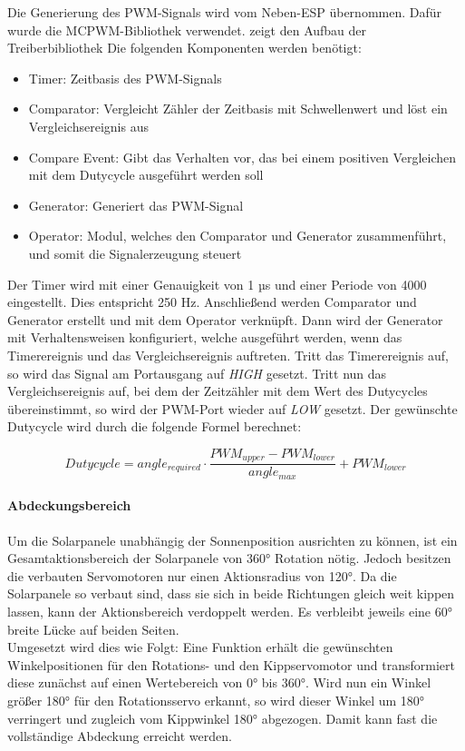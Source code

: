 Die Generierung des PWM-Signals wird vom Neben-ESP übernommen.
Dafür wurde die MCPWM-Bibliothek verwendet.
\autocite{fig:mcpwmOverview} zeigt den Aufbau der Treiberbibliothek
Die folgenden Komponenten werden benötigt:

\begin{itemize}
    \item Timer: Zeitbasis des PWM-Signals
    \item Comparator: Vergleicht Zähler der Zeitbasis mit Schwellenwert und löst ein Vergleichsereignis aus
    \item Compare Event: Gibt das Verhalten vor, das bei einem positiven Vergleichen mit dem Dutycycle ausgeführt werden soll
    \item Generator: Generiert das PWM-Signal
    \item Operator: Modul, welches den Comparator und Generator zusammenführt, und somit die Signalerzeugung steuert
\end{itemize}

Der Timer wird mit einer Genauigkeit von 1 µs und einer Periode von 4000 eingestellt.
Dies entspricht 250 Hz.
Anschließend werden Comparator und Generator erstellt und mit dem Operator verknüpft.
Dann wird der Generator mit Verhaltensweisen konfiguriert, welche ausgeführt werden, wenn das Timerereignis und das Vergleichsereignis auftreten.
Tritt das Timerereignis auf, so wird das Signal am Portausgang auf \emph{HIGH} gesetzt.
Tritt nun das Vergleichsereignis auf, bei dem der Zeitzähler mit dem Wert des Dutycycles übereinstimmt, so wird der PWM-Port wieder auf \emph{LOW} gesetzt.
Der gewünschte Dutycycle wird durch die folgende Formel berechnet:

\[Dutycycle = angle_{required} \cdot \frac{PWM_{upper} - PWM_{lower}}{angle_{max}} + PWM_{lower} \]


\paragraph{Abdeckungsbereich}
Um die Solarpanele unabhängig der Sonnenposition ausrichten zu können, ist ein Gesamtaktionsbereich der Solarpanele von 360° Rotation nötig.
Jedoch besitzen die verbauten Servomotoren nur einen Aktionsradius von 120°. Da die Solarpanele so verbaut sind, dass sie sich in beide Richtungen gleich weit kippen lassen,
kann der Aktionsbereich verdoppelt werden.
Es verbleibt jeweils eine 60° breite Lücke auf beiden Seiten.\\
Umgesetzt wird dies wie Folgt:
Eine Funktion erhält die gewünschten Winkelpositionen für den Rotations- und den Kippservomotor und transformiert diese zunächst auf einen Wertebereich von 0° bis 360°.
Wird nun ein Winkel größer 180° für den Rotationsservo erkannt, so wird dieser Winkel um 180° verringert und zugleich vom Kippwinkel 180° abgezogen.
Damit kann fast die vollständige Abdeckung erreicht werden.

